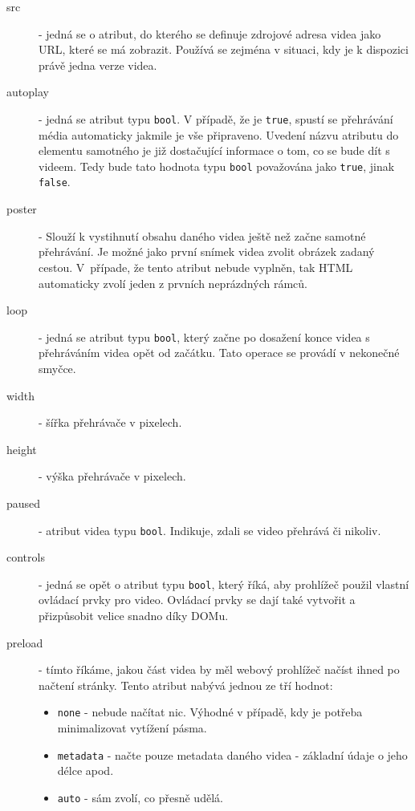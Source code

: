 \begin{description}
	\item[src] - jedná se o atribut, do kterého se definuje zdrojové adresa videa jako URL, které se má zobrazit. Používá se zejména v situaci, kdy je k dispozici právě jedna verze videa.
	
	\item[autoplay] - jedná se atribut typu \texttt{bool}. V případě, že je \texttt{true}, spustí se přehrávání média automaticky jakmile je vše připraveno. Uvedení názvu atributu do elementu samotného je již dostačující informace o tom, co se bude dít s videem. Tedy bude tato hodnota typu \texttt{bool} považována jako \texttt{true}, jinak \texttt{false}.	
	
	\item[poster]  - Slouží k vystihnutí obsahu daného videa ještě než začne samotné přehrávání. Je možné jako první snímek videa zvolit obrázek zadaný cestou. V~případe, že tento atribut nebude vyplněn, tak HTML automaticky zvolí jeden z prvních neprázdných rámců. \cite{HTML5aCSS3}
	
	\item[loop]  - jedná se atribut typu \texttt{bool}, který začne po dosažení konce videa s přehráváním videa opět od začátku. Tato operace se provádí v nekonečné smyčce.

	\item[width] - šířka přehrávače v pixelech.
	
	\item[height] - výška přehrávače v pixelech.

	\item[paused] - atribut videa typu \texttt{bool}. Indikuje, zdali se video přehrává či nikoliv.

	\item[controls] - jedná se opět o atribut typu \texttt{bool}, který říká, aby prohlížeč použil vlastní ovládací prvky pro video. Ovládací prvky se dají také vytvořit a přizpůsobit velice snadno díky DOMu.
 	
 	\item[preload]  - tímto říkáme, jakou část videa by měl webový prohlížeč načíst ihned po načtení stránky. Tento atribut nabývá jednou ze tří hodnot:
	 	\begin{itemize}
	 		\item \texttt{none} - nebude načítat nic. Výhodné v případě, kdy je potřeba minimalizovat vytížení pásma.	 		
	 		\item \texttt{metadata} - načte pouze metadata daného videa - základní údaje o jeho délce apod.
	 		\item \texttt{auto} - sám zvolí, co přesně udělá. \cite{HTML5aCSS3}
	 	\end{itemize}
\end{description}

